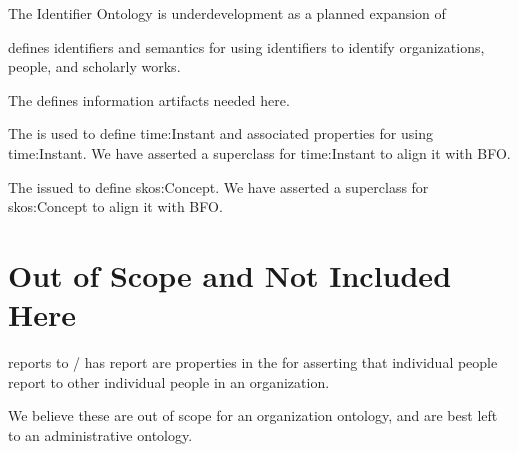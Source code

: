 \documentclass[letterpaper,10pt,english]{sphinxmanual}
\begin{document}
\begin{sphinxShadowBox}

\sphinxAtStartPar
{} %
\begin{footnote}[1]\sphinxAtStartFootnote
The Identifier Ontology is underdevelopment as a planned expansion of 
%
\end{footnote}
defines identifiers and semantics for using
identifiers to identify organizations, people, and scholarly works.
\end{sphinxShadowBox}

\begin{sphinxShadowBox}

\sphinxAtStartPar
The  defines information artifacts needed here.
\end{sphinxShadowBox}

\begin{sphinxShadowBox}

\sphinxAtStartPar
The  is used to define time:Instant and associated properties for using
time:Instant.  We have asserted a superclass for time:Instant to align it with
BFO.
\end{sphinxShadowBox}

\begin{sphinxShadowBox}

\sphinxAtStartPar
The  issued to define skos:Concept.  We have asserted a superclass for
skos:Concept
to align it with BFO.
\end{sphinxShadowBox}


\section{Out of Scope and Not Included Here}
\label{\detokenize{out-of-scope:out-of-scope-and-not-included-here}}
\begin{sphinxShadowBox}

\sphinxAtStartPar
reports to / has report are properties in the  for
asserting that individual people report to other individual people in an organization.

\sphinxAtStartPar
We believe these are out of scope for an organization ontology, and are best left to
an
administrative ontology.
\end{sphinxShadowBox}
\end{document}
